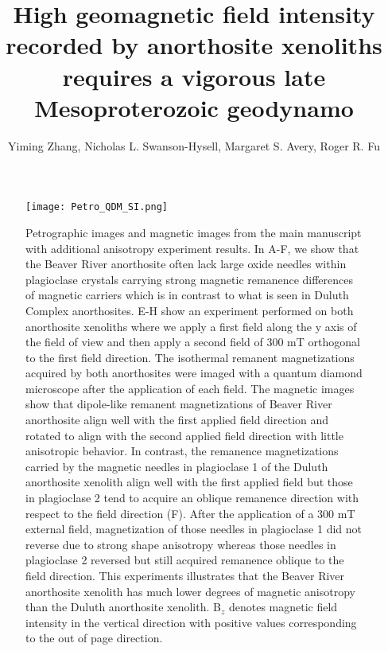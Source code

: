 \documentclass[9pt,twoside,lineno]{pnas-new}
\title{High geomagnetic field intensity recorded by anorthosite xenoliths requires a vigorous late Mesoproterozoic geodynamo}
\author{Yiming Zhang, Nicholas L. Swanson-Hysell, Margaret S. Avery, Roger R. Fu}
\begin{document}
\maketitle

\begin{figure}[h!]
\noindent\texttt{[image: Petro\_QDM\_SI.png]}
\centering
\caption{{Petrographic images and magnetic images from the main manuscript with additional anisotropy experiment results. In A-F, we show that the Beaver River anorthosite often lack large oxide needles within plagioclase crystals carrying strong magnetic remanence  differences of magnetic carriers which is in contrast to what is seen in Duluth Complex anorthosites. E-H show an experiment performed on both anorthosite xenoliths where we apply a first field along the y axis of the field of view and then apply a second field of 300 mT orthogonal to the first field direction. The isothermal remanent magnetizations acquired by both anorthosites were imaged with a quantum diamond microscope after the application of each field. The magnetic images show that dipole-like remanent magnetizations of Beaver River anorthosite align well with the first applied field direction and rotated to align with the second applied field direction with little anisotropic behavior. In contrast, the remanence magnetizations carried by the magnetic needles in plagioclase 1 of the Duluth anorthosite xenolith align well with the first applied field but those in plagioclase 2 tend to acquire an oblique remanence direction with respect to the field direction (F). After the application of a 300 mT external field, magnetization of those needles in plagioclase 1 did not reverse due to strong shape anisotropy whereas those needles in plagioclase 2 reversed but still acquired remanence oblique to the field direction. This experiments illustrates that the Beaver River anorthosite xenolith has much lower degrees of magnetic anisotropy than the Duluth anorthosite xenolith. B$_z$ denotes magnetic field intensity in the vertical direction with positive values corresponding to the out of page direction.  }}
\label{fig:Petro_QDM_SI}
\end{figure}
\clearpage
\end{document}
